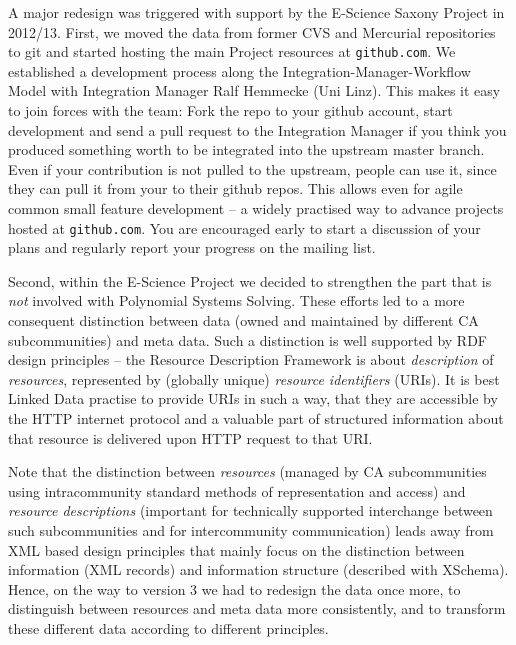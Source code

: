 \documentclass[a4paper,11pt]{article}
\begin{document}
\begin{multicols}{2}

A major redesign was triggered with support by the E-Science Saxony Project
\cite{E-Science-Sachsen} in 2012/13. First, we moved the data from former CVS
and Mercurial repositories to git and started hosting the main {\SD} Project
resources at \texttt{github.com}.  We established a development process along
the Integration-Manager-Workflow Model with Integration Manager Ralf Hemmecke
(Uni Linz).  This makes it easy to join forces with the {\SD} team: Fork the
repo to your github account, start development and send a pull request to the
Integration Manager if you think you produced something worth to be integrated
into the up\-stream master branch.  Even if your contribution is not pulled to
the upstream, people can use it, since they can pull it from your to their
github repos. This allows even for agile common small feature development -- a
widely practised way to advance projects hosted at \texttt{github.com}. You are
encouraged early to start a discussion of your plans and regularly report your
progress on the {\SD} mailing list.


Second, within the E-Science Project we decided to strengthen the {\SD} part
that is \emph{not} involved with Polynomial Systems Solving.  These efforts
led to a more consequent distinction between data (owned and maintained by
different CA subcommunities) and meta data. Such a distinction is well
supported by RDF design principles -- the Resource Description Framework is
about \emph{description} of \emph{resources}, represented by (globally unique)
\emph{resource identifiers} (URIs). It is best Linked Data practise to provide
URIs in such a way, that they are accessible by the HTTP internet protocol and
a valuable part of structured information about that resource is delivered upon
HTTP request to that URI.

Note that the distinction between \emph{resources} (managed by CA
subcommunities using intracommunity standard methods of representation and
access) and \emph{resource descriptions} (important for technically supported
interchange between such subcommunities and for intercommunity communication)
leads away from XML based design principles that mainly focus on the
distinction between information (XML records) and information structure
(described with XSchema). Hence, on the way to {\SD} version 3 we had to
redesign the data once more, to distinguish between resources and meta data
more consistently, and to transform these different data according to different
principles.


\end{multicols}
\end{document}
